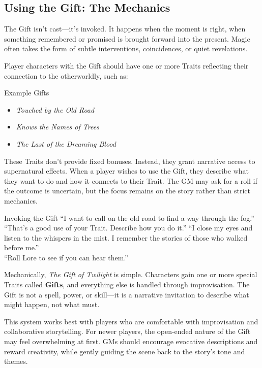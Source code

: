 \subsection{Using the Gift: The Mechanics}

The Gift isn’t cast—it’s invoked. It happens when the moment is right, when something remembered or promised is brought forward into the present. Magic often takes the form of subtle interventions, coincidences, or quiet revelations.

Player characters with the Gift should have one or more Traits reflecting their connection to the otherworldly, such as:

\begin{Example}{Example Gifts}
    \begin{itemize}
        \item \textit{Touched by the Old Road}  
        \item \textit{Knows the Names of Trees}  
        \item \textit{The Last of the Dreaming Blood}  
    \end{itemize}
\end{Example}

These Traits don’t provide fixed bonuses. Instead, they grant narrative access to supernatural effects. When a player wishes to use the Gift, they describe what they want to do and how it connects to their Trait. The GM may ask for a roll if the outcome is uncertain, but the focus remains on the story rather than strict mechanics.

\begin{ExampleGame}{Invoking the Gift}
    \line[Player] “I want to call on the old road to find a way through the fog.”
    \line[GM]     “That’s a good use of your Trait. Describe how you do it.”
    \line[Player] “I close my eyes and listen to the whispers in the mist. I remember the stories of those who walked before me.”  \\
    \line[GM]     “Roll Lore to see if you can hear them.”
\end{ExampleGame}

Mechanically, \emph{The Gift of Twilight} is simple. Characters gain one or more special Traits called \textbf{Gifts}, and everything else is handled through improvisation. The Gift is not a spell, power, or skill—it is a narrative invitation to describe what might happen, not what must.

This system works best with players who are comfortable with improvisation and collaborative storytelling. For newer players, the open-ended nature of the Gift may feel overwhelming at first. GMs should encourage evocative descriptions and reward creativity, while gently guiding the scene back to the story's tone and themes.

